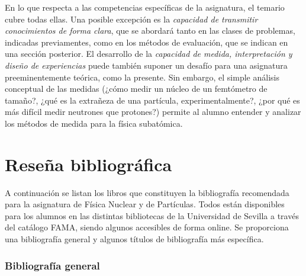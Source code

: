 \documentclass[a4paper,12pt,twoside]{article}
\begin{document}
En lo que respecta a las competencias específicas de la asignatura, el temario cubre todas ellas. Una posible excepción es la \textit{capacidad de transmitir conocimientos de forma clara}, que se abordará tanto en las clases de problemas, indicadas previamentes, como en los métodos de evaluación, que se indican en una sección posterior. El desarrollo de la \textit{capacidad de medida, interpretación y diseño de experiencias} puede también suponer un desafío para una asignatura preeminentemente teórica, como la presente. Sin embargo, el simple análisis conceptual de las medidas (¿cómo medir un núcleo de un femtómetro de tamaño?, ¿qué es la extrañeza de una partícula, experimentalmente?, ¿por qué es más difícil medir neutrones que protones?) permite al alumno entender y analizar los métodos de medida para la física subatómica.

\section{Reseña bibliográfica}
A continuación se listan los libros que constituyen la bibliografía recomendada para la asignatura de Física Nuclear y de Partículas. Todos están disponibles para los alumnos en las distintas bibliotecas de la Universidad de Sevilla a través del catálogo FAMA, siendo algunos accesibles de forma online. Se proporciona una bibliografía general y algunos títulos de bibliografía más específica.

\subsubsection*{Bibliografía general}
\end{document}
